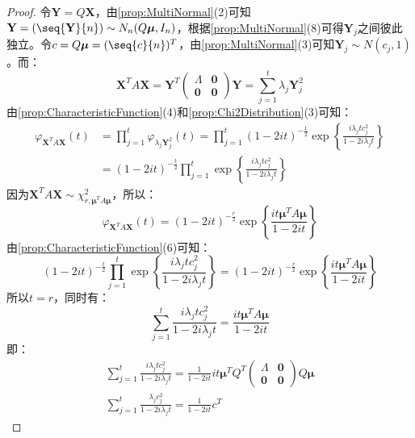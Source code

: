 \begin{proof}
	令$\mathbf{Y}=Q\mathbf{X}$，由\cref{prop:MultiNormal}(2)可知$\mathbf{Y}=(\seq{\mathbf{Y}}{n})\sim N_n(Q\boldsymbol{\mu},I_n)$，根据\cref{prop:MultiNormal}(8)可得$\mathbf{Y}_j$之间彼此独立。令$c=Q\boldsymbol{\mu}=(\seq{c}{n})^T$，由\cref{prop:MultiNormal}(3)可知$\mathbf{Y}_j\sim N(c_j,1)$。而：
	\begin{equation*}
		\mathbf{X}^TA\mathbf{X}=\mathbf{Y}^T
		\begin{pmatrix}
			\varLambda & \mathbf{0} \\
			\mathbf{0} & \mathbf{0}
		\end{pmatrix}\mathbf{Y}=\sum_{j=1}^{t}\lambda_j\mathbf{Y}_j^2
	\end{equation*}
	由\cref{prop:CharacteristicFunction}(4)和\cref{prop:Chi2Distribution}(3)可知：
	\begin{align*}
		\varphi_{\mathbf{X}^TA\mathbf{X}}(t)
		&=\prod_{j=1}^{t}\varphi_{\lambda_j\mathbf{Y}_j^2}(t)=\prod_{j=1}^t(1-2it)^{-\frac{1}{2}}\exp\left\{\frac{i\lambda_jtc_j^2}{1-2i\lambda_jt}\right\} \\
		&=(1-2it)^{-\frac{t}{2}}\prod_{j=1}^t\exp\left\{\frac{i\lambda_jtc_j^2}{1-2i\lambda_jt}\right\}
	\end{align*}
	因为$\mathbf{X}^TA\mathbf{X}\sim\chi_{r,\boldsymbol{\mu}^TA\boldsymbol{\mu}}^2$，所以：
	\begin{equation*}
		\varphi_{\mathbf{X}^TA\mathbf{X}}(t)=(1-2it)^{-\frac{r}{2}}\exp\left\{\frac{it\boldsymbol{\mu}^TA\boldsymbol{\mu}}{1-2it}\right\}
	\end{equation*}
	由\cref{prop:CharacteristicFunction}(6)可知：
	\begin{equation*}
		(1-2it)^{-\frac{t}{2}}\prod_{j=1}^t\exp\left\{\frac{i\lambda_jtc_j^2}{1-2i\lambda_jt}\right\}=(1-2it)^{-\frac{r}{2}}\exp\left\{\frac{it\boldsymbol{\mu}^TA\boldsymbol{\mu}}{1-2it}\right\}
	\end{equation*}
	所以$t=r$，同时有：
	\begin{equation*}
		\sum_{j=1}^{t}\frac{i\lambda_jtc_j^2}{1-2i\lambda_jt}=\frac{it\boldsymbol{\mu}^TA\boldsymbol{\mu}}{1-2it}
	\end{equation*}
	即：
	\begin{gather*}
		\sum_{j=1}^{t}\frac{i\lambda_jtc_j^2}{1-2i\lambda_jt}=\frac{1}{1-2it}it\boldsymbol{\mu}^TQ^T
		\begin{pmatrix}
			\varLambda & \mathbf{0} \\
			\mathbf{0} & \mathbf{0}
		\end{pmatrix}
		Q\boldsymbol{\mu} \\
		\sum_{j=1}^{t}\frac{\lambda_jc_j^2}{1-2i\lambda_jt}=\frac{1}{1-2it}c^T

\end{gather*}
\end{proof}
